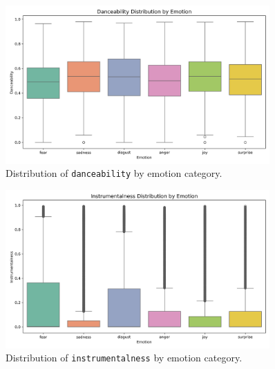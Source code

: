 \documentclass{article}
\begin{document}
\begin{figure}[H]
\centering
\includegraphics[width=0.9\textwidth]{Graphics/feature_by_emotion/danceability_by_emotion_boxplot.png}
\caption{Distribution of \texttt{danceability} by emotion category.}
\end{figure}

\begin{figure}[H]
\centering
\includegraphics[width=0.9\textwidth]{Graphics/feature_by_emotion/instrumentalness_by_emotion_boxplot.png}
\caption{Distribution of \texttt{instrumentalness} by emotion category.}
\end{figure}
\end{document}
